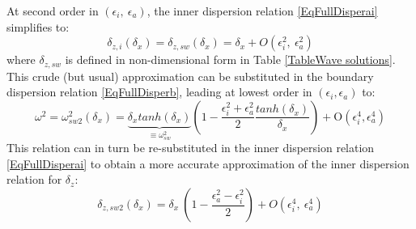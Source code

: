 \documentclass[a4paper,11pt]{article}
\begin{document}
At second order in $(\epsilon_i,\ \epsilon_a)$, the inner dispersion relation \ref{EqFullDisperai} simplifies to:
\begin{equation}
	\label{Eqdzdx1}
	\displaystyle
	\delta_{z,i}(\delta_x) = \delta_{z,sw}(\delta_x)=\delta_x + O(\epsilon_i^2,\ \epsilon_a^2)
\end{equation}
where $\delta_{z,sw}$ is defined in non-dimensional form in Table \ref{TableWave solutions}. This crude (but usual) approximation can be substituted in the boundary dispersion relation \ref{EqFullDisperb}, leading at lowest order in $(\epsilon_i,\epsilon_a)$ to:
\begin{equation}
	\label{EqDispLonga1}
	\displaystyle
	\omega^2=\omega_{sw2}^2(\delta_x) =\underbrace{\delta_x
	 tanh(\delta_{x})}_{\equiv\omega_{sw}^2}
	 \left(1-
	 \frac{\epsilon_i^2+\epsilon_a^2}{2}\frac{tanh(\delta_{x})}{\delta_x}
	 \right)
	 + \mathrm{O}(\epsilon_i^4,\epsilon_a^4)
\end{equation}
This relation can in turn be re-substituted in the inner dispersion relation \ref{EqFullDisperai} to obtain a more accurate approximation of the inner dispersion relation for $\delta_z$:
\begin{equation}
	\label{Eqdzdx2}
	\displaystyle
	\delta_{z,sw2}(\delta_x) = \delta_x\ 
	\left( 1-\frac{\epsilon_a^2-\epsilon_i^2}{2} \right)
	 + O(\epsilon_i^4,\ \epsilon_a^4)
\end{equation}
\end{document}
